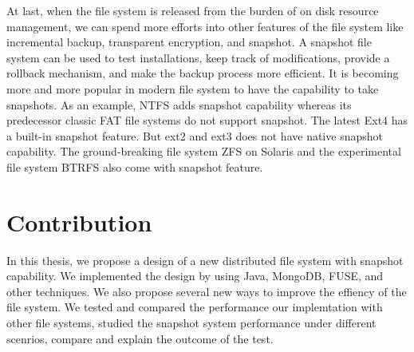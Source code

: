     At last, when the file system is released from the burden of on disk resource management, we can spend more efforts into other features of the file system like incremental backup, transparent encryption, and snapshot. A snapshot file system can be used to test installations, keep track of modifications, provide a rollback mechanism, and make the backup process more efficient. It is becoming more and more popular in modern file system to have the capability to take snapshots. As an example, NTFS adds snapshot capability whereas its predecessor classic FAT file systems do not support snapshot. The latest Ext4 has a built-in snapshot feature. But ext2 and ext3 does not have native snapshot capability. The ground-breaking file system ZFS on Solaris and the experimental file system BTRFS also come with snapshot feature.

\section{Contribution}

    In this thesis, we propose a design of a new distributed file system with snapshot capability. We implemented the design by using Java, MongoDB, FUSE, and other techniques. We also propose several new ways to improve the effiency of the file system. We tested and compared the performance our implemtation with other file systems, studied the snapshot system performance under different scenrios, compare and explain the outcome of the test.
